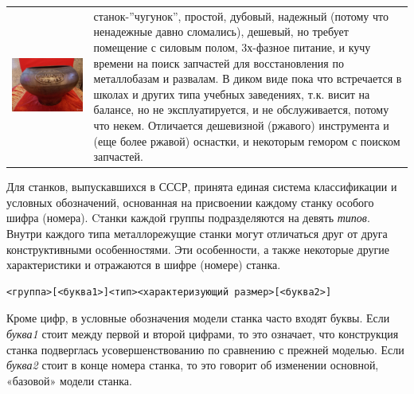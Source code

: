 
\begin{tabular}{p{} p{}}
\includegraphics[height=0.3\textheight]{stanki/chugunok.jpg}
&
станок-''чугунок'', простой, дубовый, надежный (потому что ненадежные давно
сломались), дешевый, но требует помещение с силовым полом, 3х-фазное питание, и
кучу времени на поиск запчастей для восстановления по металлобазам и развалам. В
диком виде пока что встречается в школах и других типа учебных заведениях, т.к.
висит на балансе, но не эксплуатируется, и не обслуживается, потому что некем.
Отличается дешевизной (ржавого) инструмента и (еще более ржавой) оснастки, и
некоторым гемором с поиском запчастей.
\\
\end{tabular}
\clearpage


Для станков, выпускавшихся в СССР, принята единая система классификации и
условных обозначений, основанная на присвоении каждому станку особого шифра
(номера). Cтанки каждой группы подразделяются на девять \emph{типов}.
Внутри каждого типа металлорежущие станки могут отличаться друг от друга
конструктивными особенностями. Эти особенности, а также некоторые другие
характеристики и отражаются в шифре (номере) станка.

\begin{verbatim}
<группа>[<буква1>]<тип><характеризующий размер>[<буква2>]
\end{verbatim}

Кроме цифр, в условные обозначения модели станка часто входят буквы. Если
\emph{буква1} стоит между первой и второй цифрами, то это означает, что
конструкция станка подверглась усовершенствованию по сравнению с прежней
моделью. Если \emph{буква2} стоит в конце номера станка, то это говорит об
изменении основной, «базовой» модели станка.

